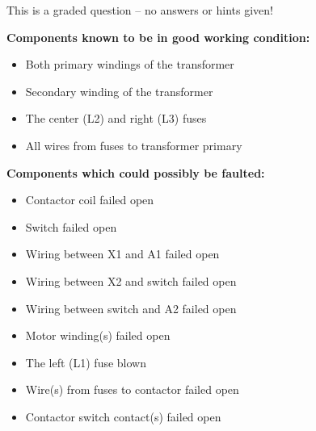 \vfil 

\eject






This is a graded question -- no answers or hints given!







\noindent
{\bf Components known to be in good working condition:}

\begin{itemize}
\item{} Both primary windings of the transformer
\item{} Secondary winding of the transformer
\item{} The center (L2) and right (L3) fuses
\item{} All wires from fuses to transformer primary
\end{itemize}

\vskip 10pt

\goodbreak
\noindent
{\bf Components which could possibly be faulted:}

\begin{itemize}
\item{} Contactor coil failed open
\item{} Switch failed open
\item{} Wiring between X1 and A1 failed open
\item{} Wiring between X2 and switch failed open
\item{} Wiring between switch and A2 failed open
\item{} Motor winding(s) failed open
\item{} The left (L1) fuse blown
\item{} Wire(s) from fuses to contactor failed open
\item{} Contactor switch contact(s) failed open
\end{itemize}




